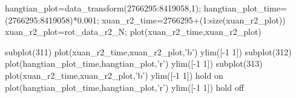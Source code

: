 hangtian_plot=data_transform(2766295:8419058,1);
hangtian_plot_time=(2766295:8419058)*0.001;
xuan_r2_time=2766295+(1:size(xuan_r2_plot))
xuan_r2_plot=rot_data_r2_N;
plot(xuan_r2_time,xuan_r2_plot)



subplot(311)
plot(xuan_r2_time,xuan_r2_plot,'b')
ylim([-1 1])
subplot(312)
plot(hangtian_plot_time,hangtian_plot,'r')
ylim([-1 1])
subplot(313)
plot(xuan_r2_time,xuan_r2_plot,'b')
ylim([-1 1])
hold on
plot(hangtian_plot_time,hangtian_plot,'r')
ylim([-1 1])
hold off